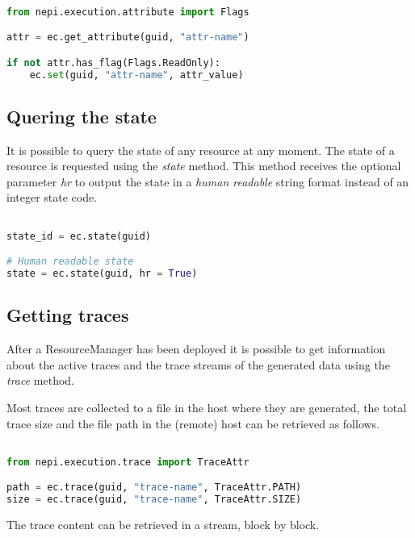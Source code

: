 \begin{lstlisting}[language=Python]

from nepi.execution.attribute import Flags

attr = ec.get_attribute(guid, "attr-name")

if not attr.has_flag(Flags.ReadOnly):
    ec.set(guid, "attr-name", attr_value)

\end{lstlisting}

\subsection{Quering the state}

It is possible to query the state of any resource at any moment.
The state of a resource is requested using the \emph{state} method.
This method receives the optional parameter \emph{hr} to output the
state in a \emph{human readable} string format instead of an integer
state code.

\begin{lstlisting}[language=Python]

state_id = ec.state(guid)

# Human readable state
state = ec.state(guid, hr = True)

\end{lstlisting}

\subsection{Getting traces}

After a ResourceManager has been deployed it is possible to get information
about the active traces and the trace streams of the generated data using
the \emph{trace} method.

Most traces are collected to a file in the host where they are generated, 
the total trace size and the file path in the (remote) host can be 
retrieved as follows.

\begin{lstlisting}[language=Python]

from nepi.execution.trace import TraceAttr

path = ec.trace(guid, "trace-name", TraceAttr.PATH)
size = ec.trace(guid, "trace-name", TraceAttr.SIZE)

\end{lstlisting}

The trace content can be retrieved in a stream, block by block.

